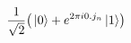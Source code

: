 \documentclass[preview]{standalone}
\begin{document}
\begin{align*}
\frac{1}{\sqrt{2}} \bigr( \ket{0} + e^{2\pi i 0.j_n } \ket{1}\bigr)
\end{align*}
\end{document}
